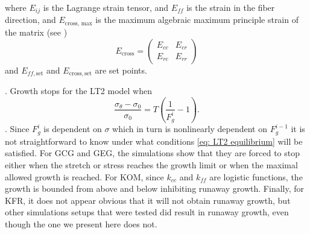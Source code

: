 where $E_{ij}$ is the Lagrange strain tensor, and $E_{ff}$ is the strain in the fiber direction, and $E_\text{cross, max}$ is the maximum algebraic maximum principle strain of the matrix (see \citep{Witzenburg2018})
\begin{equation*}
    E_\text{cross} = \begin{pmatrix}
        E_{cc} & E_{cr} \\
        E_{rc} & E_{rr}
    \end{pmatrix}
\end{equation*}
and $E_{ff, \mathrm{set}}$ and $E_\mathrm{cross, set}$ are set points. \par
{}\citep{Witzenburg2018}. Growth stops for the LT2 model when \begin{equation}
\label{eq: LT2 equilibrium}
    \frac{\sigma_{\theta} - \sigma_{0}}{\sigma_{0}} = T\left(\frac{1}{F_{g}^i} - 1\right).
\end{equation}
 \citep{Witzenburg2018}. Since $F_g^i$ is dependent on $\sigma$ which in turn is nonlinearly dependent on $F_g^{i-1}$ it is not straightforward to know under what conditions \ref{eq: LT2 equilibrium} will be satisfied. For GCG and GEG, the simulations show that they are forced to stop either when the stretch or stress reaches the growth limit or when the maximal allowed growth is reached. For KOM, since $k_{cc}$ and $k_{ff}$ are logistic functions, the growth is bounded from above and below inhibiting runaway growth. Finally, for KFR, it does not appear obvious that it will not obtain runaway growth, but other simulations setups that were tested did result in runaway growth, even though the one we present here does not.
